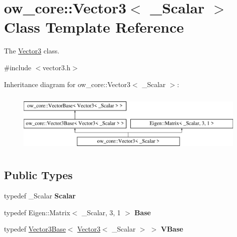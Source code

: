 \hypertarget{classow__core_1_1Vector3}{}\section{ow\+\_\+core\+:\+:Vector3$<$ \+\_\+\+Scalar $>$ Class Template Reference}
\label{classow__core_1_1Vector3}


The \hyperlink{classow__core_1_1Vector3}{Vector3} class.  




{\ttfamily \#include $<$vector3.\+h$>$}

Inheritance diagram for ow\+\_\+core\+:\+:Vector3$<$ \+\_\+\+Scalar $>$\+:\begin{figure}[H]
\begin{center}
\leavevmode
\includegraphics[height=2.947368cm]{df/dc3/classow__core_1_1Vector3}
\end{center}
\end{figure}
\subsection*{Public Types}
\begin{DoxyCompactItemize}
\item 
typedef \+\_\+\+Scalar {\bfseries Scalar}\hypertarget{classow__core_1_1Vector3_a13a53dc729069a5c30a2c188bbbffbe4}{}\label{classow__core_1_1Vector3_a13a53dc729069a5c30a2c188bbbffbe4}

\item 
typedef Eigen\+::\+Matrix$<$ \+\_\+\+Scalar, 3, 1 $>$ {\bfseries Base}\hypertarget{classow__core_1_1Vector3_a0f15e852b17b0f5de0ebfc879df70fcd}{}\label{classow__core_1_1Vector3_a0f15e852b17b0f5de0ebfc879df70fcd}

\item 
typedef \hyperlink{classow__core_1_1Vector3Base}{Vector3\+Base}$<$ \hyperlink{classow__core_1_1Vector3}{Vector3}$<$ \+\_\+\+Scalar $>$ $>$ {\bfseries V\+Base}\hypertarget{classow__core_1_1Vector3_a48e0870dce125c606af7cfb81c5a427b}{}\label{classow__core_1_1Vector3_a48e0870dce125c606af7cfb81c5a427b}

\end{DoxyCompactItemize}
